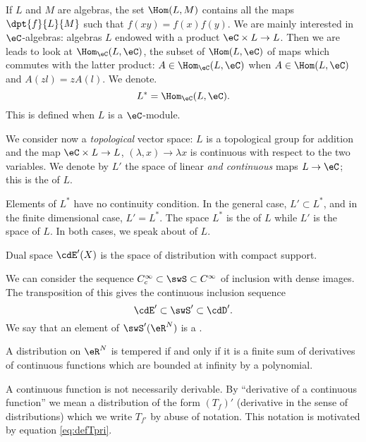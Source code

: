 If $L$ and $M$ are algebras, the set $\Hom(L,M)$ contains all the maps $\dpt{f}{L}{M}$ such that $f(xy)=f(x)f(y)$. We are mainly interested in $\eC$-algebras: algebras $L$ endowed with a product $\eC\times L\to L$. Then we are leads to look at $\Hom_{\eC}(L,\eC)$, the subset of $\Hom(L,\eC)$ of maps which commutes with the latter product: $A\in\Hom_{\eC}(L,\eC)$ when $A\in\Hom(L,\eC)$ and $A(zl)=zA(l)$. We denote.
\begin{equation}
  L^*=\Hom_{\eC}(L,\eC).
\end{equation}
This is defined when $L$ is a $\eC$-module.

We consider now a \emph{topological} vector space: $L$ is a topological group for addition and the map $\eC\times L\to L$, $(\lambda,x)\to \lambda x$ is continuous with respect to the two variables. We denote by $L'$ the space of linear \emph{and continuous} maps $L\to \eC$; this is the  of $L$.

Elements of $L^*$ have no continuity condition. In the general case, $L'\subset L^*$, and in the finite dimensional case, $L'=L^*$. The space $L^*$ is the  of $L$ while $L'$ is the  space of $L$. In both cases, we speak about  of $L$.


\begin{proposition} 
Dual space $\cdE'(X)$ is the space of distribution with compact support.
\label{prop:dualCinfcompact}
\end{proposition}

We can consider the sequence $ C^{\infty}_c\subset\swS\subset C^{\infty}$ of inclusion with dense images. The transposition of this gives the continuous inclusion sequence
\[ 
  \cdE'\subset\swS'\subset\cdD'.
\]
We say that an element of $\swS'(\eR^N)$ is a .

\begin{proposition} 
A distribution on $\eR^N$ is tempered if and only if it is a finite sum of derivatives of continuous functions which are bounded at infinity by a polynomial.
 \label{prop_distr_temp_sum}
\end{proposition}

A continuous function is not necessarily derivable. By ``derivative of a continuous function'' we mean a distribution of the form $(T_f)'$ (derivative in the sense of distributions) which we write $T_{f'}$ by abuse of notation. This notation is motivated by equation \eqref{eq:defTpri}. 

